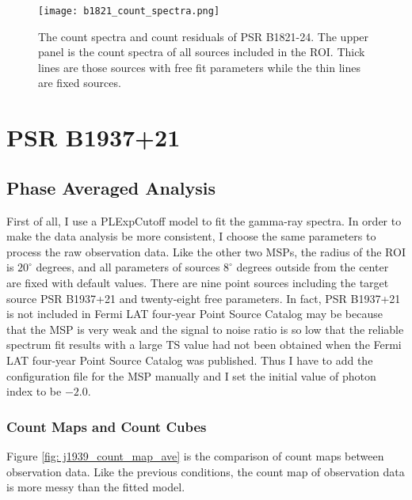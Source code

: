 \documentclass[12pt]{report}
\newcommand{\fgl}[0]{
  Fermi LAT four-year Point Source Catalog
}
\begin{document}
      \begin{figure}[!htp]
        \centering
        \texttt{[image: b1821\_count\_spectra.png]}
        \caption{The count spectra and count residuals of PSR B1821-24.
                The upper panel is the count spectra of all sources included in the 
                ROI. Thick lines are those sources with free fit parameters 
                while the thin lines are fixed sources.} 
        \label{fig: b1821_count_spectra}
      \end{figure}


  \section{PSR B1937+21}
    \subsection{Phase Averaged Analysis}
      First of all, I use a PLExpCutoff model to fit the gamma-ray spectra. 
      In order to make the data analysis be more consistent, I choose the same parameters
      to process the raw observation data. Like the other two MSPs, the radius of the ROI 
      is $20^{\circ}$ degrees, and all parameters of sources $8^{\circ}$ degrees outside 
      from the center are fixed with default values. There are nine point sources including 
      the target source PSR B1937+21 and twenty-eight free parameters. In fact, PSR B1937+21
      is not included in \fgl{} may be because that the MSP is very weak and the signal to 
      noise ratio is so low that the reliable spectrum fit results with a large TS value 
      had not been obtained when the \fgl{} was published. Thus I have to add the 
      configuration file for the MSP manually and I set the initial value of photon index 
      to be $-2.0$.

      \subsubsection{Count Maps and Count Cubes}
        Figure \ref{fig: j1939_count_map_ave} is the comparison of count maps between 
        observation data. Like the previous conditions, the count map of observation data is 
        more messy than the fitted model. 
\end{document}
